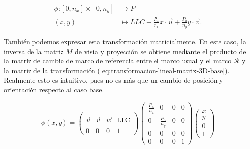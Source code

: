 \begin{equation}
    \label{eq:transformacion-lineal-6}
    \begin{split}
        \phi : [0,n_x]\times [0,n_y] & \longrightarrow P \\
        (x,y) & \longmapsto LLC + \frac{P_w}{n_x}x\cdot \vec u + \frac{P_h}{n_y}y\cdot\vec v.
    \end{split}
\end{equation}

También podemos expresar esta transformación matricialmente. En este caso, la inversa de la matriz $M$ de vista y proyección se obtiene mediante el producto de la matriz de cambio de marco de referencia entre el marco usual y el marco $\mathcal{R}$ y la matriz de la transformación (\ref{eq:transformacion-lineal-matrix-3D-base}). Realmente esto es intuitivo, pues no es más que un cambio de posición y orientación respecto al caso base.

\begin{equation}
    \label{eq:transformacion-lineal-matrix-3D-camara}
    \phi(x,y) = \left(\begin{array}{ccc|c}
        &  &  &  \\
        \vec u & \vec v & \vec w & \mathrm{LLC} \\
        &  &  &  \\ \hline
        0 & 0 & 0 & 1
    \end{array}\right)\left(\begin{array}{ccc|c}
        \frac{P_w}{n_x} & 0 & 0 & 0 \\
        0 & \frac{P_h}{n_y} & 0 & 0 \\
        0 & 0 & 0 & 0 \\ \hline
        0 & 0 & 0 & 1
    \end{array}\right)\left(
        \begin{array}{c}
            x \\ y \\ 0 \\ \hline 1
        \end{array}\right)
\end{equation}

